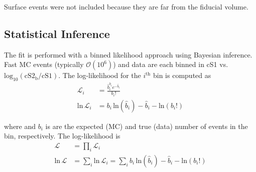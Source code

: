 Surface events were not included because they are far from the fiducial volume.



\subsection{Statistical Inference}
\label{subsec:er_nr_calibrations_parameter_determ_mc_match}
The fit is performed with a binned likelihood approach using Bayesian inference.  Fast MC events (typically $\mathcal{O}(10^6)$) and
data are each binned in cS1 vs. $\mathrm{log_{10}(cS2_b / cS1)}$.  The log-likelihood for the $i^{\mathrm{th}}$ bin is
computed as
\begin{subequations}
\begin{align}
\mathcal{L}_i &=\frac{\hat{b}_{i}^{b_i} e^{-\hat{b}_{i}}}{b_{i}!} \\
\mathrm{ln}\, \mathcal{L}_i &= b_i\, \mathrm{ln} (\hat{b}_i) - \hat{b}_i - \mathrm{ln} (b_i !)
\end{align}
\end{subequations}

\vspace{-10pt}

\noindent where \bhi and $b_i$ is are the expected (MC) and true (data) number of events in the bin, respectively.  The log-likelihood is
\begin{subequations}
\begin{align}
\mathcal{L} &= \prod_i \mathcal{L}_i \\
\mathrm{ln}\, \mathcal{L} &= \sum_i \mathrm{ln}\, \mathcal{L}_i = \sum_i b_i\, \mathrm{ln} (\hat{b}_i) - \hat{b}_i - \mathrm{ln} (b_i !)
\end{align}
\end{subequations}

\vspace{-10pt}

